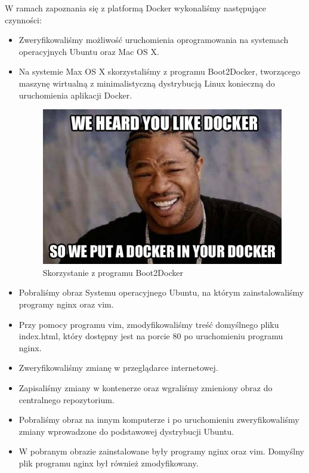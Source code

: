 W ramach zapoznania się z platformą Docker wykonaliśmy następujące czynności: 
\begin{itemize}

\item Zweryfikowaliśmy możliwość uruchomienia oprogramowania na systemach operacyjnych Ubuntu oraz Mac OS X. 


\item Na systemie Max OS X skorzystaliśmy z programu Boot2Docker, tworzącego maszynę wirtualną z minimalistyczną dystrybucją Linux konieczną do uruchomienia aplikacji Docker.

\begin{figure}[h]
\begin{center}
\includegraphics[width=0.8\linewidth]{img/docker_tut1.jpg} 
\caption{Skorzystanie z programu Boot2Docker}
\label{img:docker_tut1}
\end{center}
\end{figure}

\item Pobraliśmy obraz Systemu operacyjnego Ubuntu, na którym zainstalowaliśmy programy nginx oraz vim. 

\item Przy pomocy programu vim, zmodyfikowaliśmy treść domyślnego pliku index.html, który dostępny jest na porcie 80 po uruchomieniu programu nginx. 

\item Zweryfikowaliśmy zmianę w przeglądarce internetowej. 

\item Zapisaliśmy zmiany w kontenerze oraz wgraliśmy zmieniony obraz do centralnego repozytorium. 

\item Pobraliśmy obraz na innym komputerze i po uruchomieniu zweryfikowaliśmy zmiany wprowadzone do podstawowej dystrybucji Ubuntu. 

\item W pobranym obrazie zainstalowane były programy nginx oraz vim. Domyślny plik programu nginx był również zmodyfikowany. 

\end{itemize}

